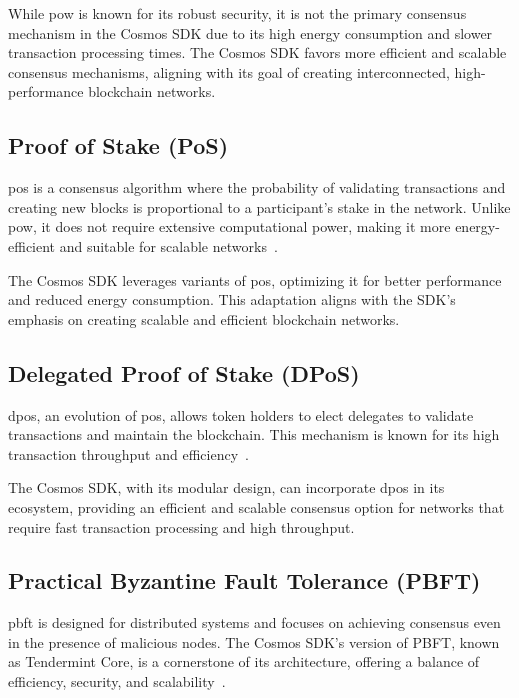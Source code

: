 While \gls{pow} is known for its robust security, it is not the primary consensus mechanism in the Cosmos SDK due to its high energy consumption and slower transaction processing times. The Cosmos SDK favors more efficient and scalable consensus mechanisms, aligning with its goal of creating interconnected, high-performance blockchain networks.

\subsection{Proof of Stake (PoS)}

\gls{pos} is a consensus algorithm where the probability of validating transactions and creating new blocks is proportional to a participant's stake in the network. Unlike \gls{pow}, it does not require extensive computational power, making it more energy-efficient and suitable for scalable networks~\cite{king2012ppcoin}.

The Cosmos SDK leverages variants of \gls{pos}, optimizing it for better performance and reduced energy consumption. This adaptation aligns with the SDK's emphasis on creating scalable and efficient blockchain networks.

\subsection{Delegated Proof of Stake (DPoS)}

\gls{dpos}, an evolution of \gls{pos}, allows token holders to elect delegates to validate transactions and maintain the blockchain. This mechanism is known for its high transaction throughput and efficiency~\cite{larimer2014delegated}.

The Cosmos SDK, with its modular design, can incorporate \gls{dpos} in its ecosystem, providing an efficient and scalable consensus option for networks that require fast transaction processing and high throughput.

\subsection{Practical Byzantine Fault Tolerance (PBFT)}

\gls{pbft} is designed for distributed systems and focuses on achieving consensus even in the presence of malicious nodes. The Cosmos SDK's version of PBFT, known as Tendermint Core, is a cornerstone of its architecture, offering a balance of efficiency, security, and scalability~\cite{castro1999practical}.

